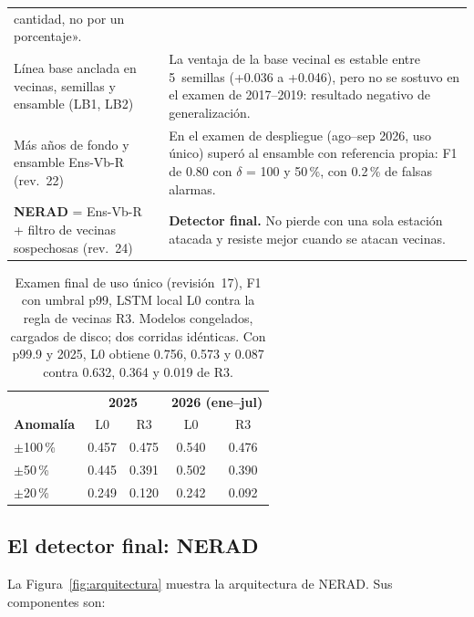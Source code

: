\documentclass[11pt, letterpaper]{article}
\begin{document}
\begin{center}
\begin{tabularx}{\linewidth}{@{}>{\raggedright\arraybackslash}p{5.4cm} Y@{}}
    cantidad, no por un porcentaje». \\
  Línea base anclada en vecinas, semillas y ensamble (LB1, LB2) &
    La ventaja de la base vecinal es estable entre 5~semillas (+0.036 a +0.046), pero no
    se sostuvo en el examen de 2017--2019: resultado negativo de generalización. \\
  Más años de fondo y ensamble Ens-Vb-R (rev.~22) &
    En el examen de despliegue (ago--sep 2026, uso único) superó al ensamble con
    referencia propia: F1 de 0.80 con $\delta$ = 100 y 50\,\%, con 0.2\,\% de falsas
    alarmas. \\
  \textbf{NERAD} = Ens-Vb-R + filtro de vecinas sospechosas (rev.~24) &
    \textbf{Detector final.} No pierde con una sola estación atacada y resiste mejor
    cuando se atacan vecinas. \\
  \bottomrule
\end{tabularx}
\end{center}

\begin{table}[H]
  \centering
  \small
  \caption{Examen final de uso único (revisión~17), F1 con umbral p99, LSTM local L0
    contra la regla de vecinas R3. Modelos congelados, cargados de disco; dos corridas
    idénticas. Con p99.9 y 2025, L0 obtiene 0.756, 0.573 y 0.087 contra 0.632, 0.364 y
    0.019 de R3.}
  \label{tab:examen17}
  \begin{tabular}{@{}l cc cc@{}}
    \toprule
    & \multicolumn{2}{c}{\textbf{2025}} & \multicolumn{2}{c}{\textbf{2026 (ene--jul)}} \\
    \cmidrule(lr){2-3}\cmidrule(lr){4-5}
    \textbf{Anomalía} & L0 & R3 & L0 & R3 \\
    \midrule
    $\pm$100\,\% & 0.457 & 0.475 & 0.540 & 0.476 \\
    $\pm$50\,\%  & 0.445 & 0.391 & 0.502 & 0.390 \\
    $\pm$20\,\%  & 0.249 & 0.120 & 0.242 & 0.092 \\
    \bottomrule
  \end{tabular}
\end{table}

\subsection{El detector final: NERAD}

La Figura~\ref{fig:arquitectura} muestra la arquitectura de NERAD. Sus componentes son:
\end{document}

